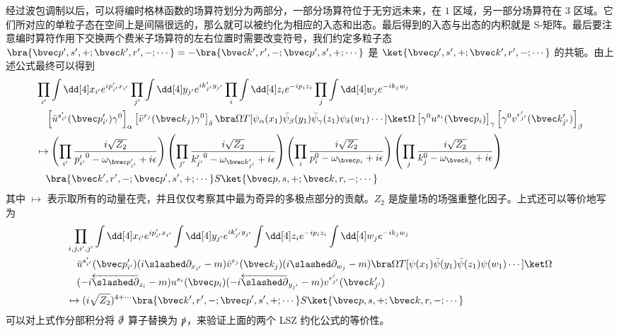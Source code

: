 经过波包调制以后，可以将编时格林函数的场算符划分为两部分，一部分场算符位于无穷远未来，在 $ 1$ 区域，另一部分场算符在 $ 3$ 区域。它们所对应的单粒子态在空间上是间隔很远的，那么就可以被约化为相应的入态和出态。最后得到的入态与出态的内积就是 S-矩阵。最后要注意编时算符作用下交换两个费米子场算符的左右位置时需要改变符号，我们约定多粒子态 $\bra{\bvec p',s',+;\bvec k',r',-;\cdots}=-\bra{\bvec k',r',-;\bvec p',s',+;\cdots}$ 是 $\ket{\bvec p',s',+;\bvec k',r',-;\cdots}$ 的共轭。由上述公式最终可以得到
\begin{align*}
&
\prod_{i'}\int \dd[4] x_{i'} e^{ip'_{i'}x_{i'}}
\prod_{j'}\int \dd[4] y_{j'} e^{ik'_{j'}y_{j'}}
\prod_{i}\int \dd[4] z_{i} e^{-ip_{i}z_{i}}
\prod_{j}\int \dd[4] w_{j} e^{-ik_{j}w_{j}}
\\
&
\quad \left[\bar u^{s'_{i'}}(\bvec p'_{i'})\gamma^0\right]_{\alpha} 
\left[{\bar v}^{r_j}(\bvec k_{j})\gamma^0\right]_{\delta}
\bra\Omega T[\psi_\alpha(x_1)\bar\psi_\beta(y_1)\bar\psi_\gamma(z_1)\psi_\delta(w_1)\cdots]\ket \Omega 
\left[\gamma^0 u^{s_i}(\bvec p_{i})\right]_{\gamma} \left[\gamma^0 v^{r'_{j'}}(\bvec k'_{j'})\right]_{\beta}
\\
&
\mapsto 
\left(\prod_{i'}\frac{i\sqrt{Z_2}} {{p'_{i'}}^0-\omega_{\bvec p'_{i'}}+i\epsilon}\right)
\left(\prod_{j'}\frac{i\sqrt{Z_2}}{{k'_{j'}}^0-\omega_{\bvec k'_{j'}}+i\epsilon}\right)
\left(\prod_{i}\frac{i\sqrt{Z_2}}{p_i^0-\omega_{\bvec p_i}+i\epsilon}\right)
\left(\prod_{j}\frac{i\sqrt{Z_2}}{k_j^0-\omega_{\bvec k_j}+i\epsilon}\right)
\\
&
\quad \bra{\bvec k',r',-;\bvec p',s',+;\cdots} S \ket{\bvec p,s,+;\bvec k,r,-;\cdots}
\end{align*}
其中 $\mapsto$ 表示取所有的动量在壳，并且仅仅考察其中最为奇异的多极点部分的贡献。$Z_2$ 是旋量场的场强重整化因子。上式还可以等价地写为
\begin{align*}
&
\prod_{i,j,i',j'}
\int \dd[4] x_{i'} e^{ip'_{i'}x_{i'}}
\int \dd[4] y_{j'} e^{ik'_{j'}y_{j'}}
\int \dd[4] z_{i}e^{-ip_{i}z_{i}}
\int \dd[4] w_{j}e^{-ik_{j}w_{j}}
\\
&
\quad \bar u^{s'_{i'}}(\bvec p'_{i'})(i\slashed \partial_{x_{i'}}-m) \bar v^{r_{j}}(\bvec k_{j})(i\slashed \partial_{w_{j}}-m) 
\bra\Omega T[\psi(x_1)\bar\psi(y_1)\bar\psi(z_1)\psi(w_1)\cdots]\ket \Omega \\
&
\quad (-i\overleftarrow{\slashed \partial}_{z_i} -m )u^{s_i}(\bvec p_i) (-i\overleftarrow{\slashed \partial}_{y_{j'}}-m) v^{r'_{j'}}(\bvec k'_{j'})
\\
&
\mapsto 
(i\sqrt{Z_2})^{4+\cdots} \bra{\bvec k',r',-;\bvec p',s',+;\cdots} S \ket{\bvec p,s,+;\bvec k,r,-;\cdots}
\end{align*}
可以对上式作分部积分将 $\slashed\partial$ 算子替换为 $\slashed p$，来验证上面的两个 LSZ 约化公式的等价性。